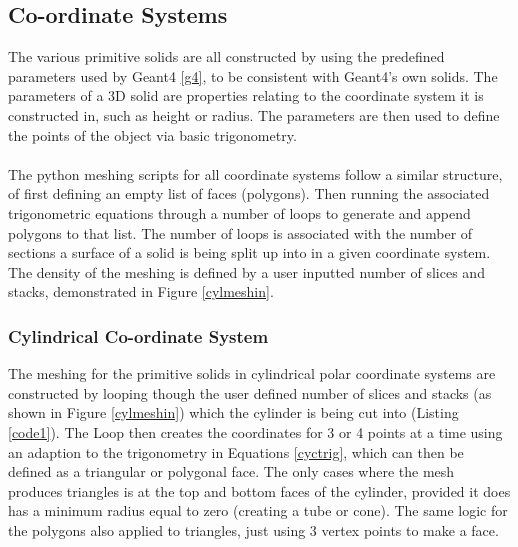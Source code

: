 \documentclass[12pt,a4paper]{article}
\begin{document}
\subsection{Co-ordinate Systems}
The various primitive solids are all constructed by using the predefined parameters used by Geant4 \ref{g4}, to be consistent with Geant4's own solids. The parameters of a 3D solid are properties relating to the coordinate system it is constructed in, such as height or radius. The parameters are then used to define the points of the object via basic trigonometry.
\\\\
The python meshing scripts for all coordinate systems follow a similar structure, of first defining an empty list of faces (polygons). Then running the associated trigonometric equations through a number of loops to generate and append polygons to that list. The number of loops is associated with the number of sections a surface of a solid is being split up into in a given coordinate system. The density of the meshing is defined by a user inputted number of slices and stacks, demonstrated in Figure \ref{cylmeshin}.

\subsubsection{Cylindrical Co-ordinate System}
\label{cycl}
The meshing for the primitive solids in cylindrical polar coordinate systems are constructed by looping though the user defined number of slices and stacks (as shown in Figure \ref{cylmeshin}) which the cylinder is being cut into (Listing \ref{code1}). The Loop then creates the coordinates for 3 or 4 points at a time using an adaption to the trigonometry in Equations \ref{cyctrig}, which can then be defined as a triangular or polygonal face. The only cases where the mesh produces triangles is at the top and bottom faces of the cylinder, provided it does has a minimum radius equal to zero (creating a tube or cone). The same logic for the polygons also applied to triangles, just using 3 vertex points to make a face.
\end{document}
